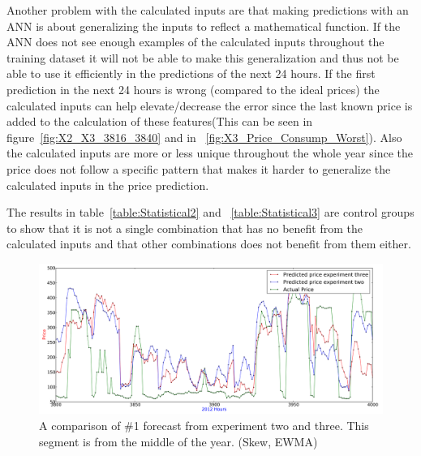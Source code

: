 Another problem with the calculated inputs are that making predictions with an ANN is about generalizing the inputs to reflect a mathematical function. If the ANN does not see enough examples of the calculated inputs throughout the training dataset it will not be able to make this generalization and thus not be able to use it efficiently in the predictions of the next 24 hours. If the first prediction in the next 24 hours is wrong (compared to the ideal prices) the calculated inputs can help elevate/decrease the error since the last known price is added to the calculation of these features(This can be seen in figure~\ref{fig:X2_X3_3816_3840} and in ~\ref{fig:X3_Price_Consump_Worst}). Also the calculated inputs are more or less unique throughout the whole year since the price does not follow a specific pattern that makes it harder to generalize the calculated inputs in the price prediction. 


The results in table~\ref{table:Statistical2} and ~\ref{table:Statistical3} are control groups to show that it is not a single combination that has no benefit from the calculated inputs and that other combinations does not benefit from them either.

\begin{figure}[H]
\centering
\includegraphics[width=\linewidth]{billeder/PriceExperimentalAnalysis/X2_X3_3800_4000.png}
\caption{A comparison of \#1 forecast from experiment two and three. This segment is from the middle of the year. (Skew, EWMA)}
\label{fig:X2_X3_3800_4000}
\end{figure}

